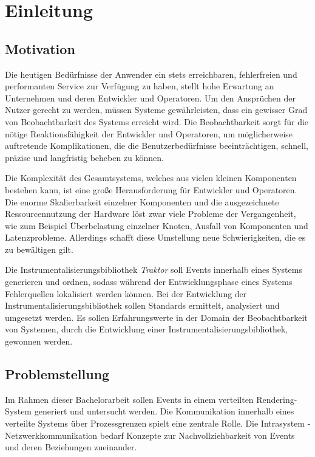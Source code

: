 %

\chapter{Einleitung}
\label{chapter:Einleitung}


\section{Motivation}
\label{section:Motivation}
	Die heutigen Bedürfnisse der Anwender ein stets erreichbaren, fehlerfreien und performanten Service zur Verfügung zu haben, stellt hohe Erwartung an Unternehmen und deren Entwickler und Operatoren. Um den Ansprüchen der Nutzer gerecht zu werden, müssen Systeme gewährleisten, dass ein gewisser Grad von Beobachtbarkeit des Systems erreicht wird. Die Beobachtbarkeit sorgt für die nötige Reaktionsfähigkeit der Entwickler und Operatoren, um möglicherweise auftretende Komplikationen, die die Benutzerbedürfnisse beeinträchtigen, schnell, präzise und langfristig beheben zu können.
	
	Die Komplexität des Gesamtsystems, welches aus vielen kleinen Komponenten bestehen kann, ist eine große Herausforderung für Entwickler und Operatoren. Die enorme Skalierbarkeit einzelner Komponenten und die ausgezeichnete Ressourcennutzung der Hardware löst zwar viele Probleme der Vergangenheit, wie zum Beispiel Überbelastung einzelner Knoten, Ausfall von Komponenten und Latenzprobleme. Allerdings schafft diese Umstellung neue Schwierigkeiten, die es zu bewältigen gilt. 
	
	Die Instrumentalisierungsbibliothek \emph{Traktor} soll Events innerhalb eines Systems generieren und ordnen, sodass während der Entwicklungsphase eines Systems Fehlerquellen lokalisiert werden können. Bei der Entwicklung der Instrumentalisierungsbibliothek sollen Standards ermittelt, analysiert und umgesetzt werden. Es sollen Erfahrungswerte in der Domain der Beobachtbarkeit von Systemen, durch die Entwicklung einer Instrumentalisierungsbibliothek, gewonnen werden.
	
\section{Problemstellung}
\label{section:Problemstellung}
	Im Rahmen dieser Bachelorarbeit sollen Events in einem verteilten Rendering-System generiert und untersucht werden. Die Kommunikation innerhalb eines verteilte Systems über Prozessgrenzen spielt eine zentrale Rolle.
	Die Intrasystem - Netzwerkkommunikation bedarf Konzepte zur Nachvollziehbarkeit von Events und deren Beziehungen zueinander. 
	
